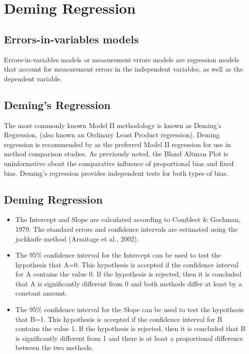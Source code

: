 \documentclass[12pt, a4paper]{report}
\theoremstyle{plain}
\theoremstyle{definition}
\theoremstyle{remark}
\begin{document}

\chapter{Deming Regression}

\section{Errors-in-variables models}
Errors-in-variables models or measurement errors models are regression models that account for measurement errors in the independent variables, as well as the dependent variable.





\section{Deming's Regression}
The most commonly known Model II methodology is known as Deming's
Regression, (also known an Ordinary Least Product regression).
Deming regression is recommended by \citet*{CornCoch} as the
preferred Model II regression for use in method comparison
studies. As previously noted, the Bland Altman Plot is
uninformative about the comparative influence of proportional bias
and fixed bias. Deming's regression provides independent tests for
both types of bias.


\section{Deming Regression}
\begin{itemize}
\item The Intercept and Slope are calculated according to Combleet \& Gochman, 1979. The standard errors and confidence intervals are estimated using the jackknife method (Armitage et al., 2002).
\item The 95\% confidence interval for the Intercept can be used to test the hypothesis that A=0. This hypothesis is accepted if the confidence interval for A contains the value 0. If the hypothesis is rejected, then it is concluded that A is significantly different from 0 and both methods differ at least by a constant amount.
\item 
The 95\% confidence interval for the Slope can be used to test the hypothesis that B=1. This hypothesis is accepted if the confidence interval for B contains the value 1. If the hypothesis is rejected, then it is concluded that B is significantly different from 1 and there is at least a proportional difference between the two methods.
\end{itemize}
\end{document}
